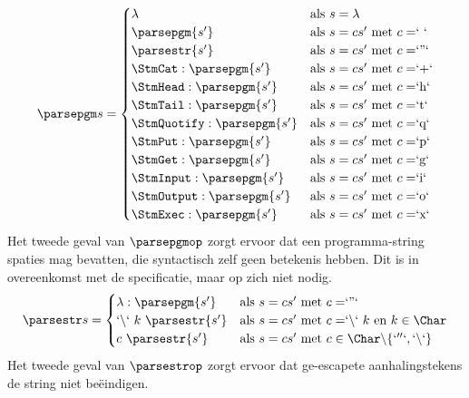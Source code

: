 $$
	\parsepgm s =
		\begin{cases}
			\lambda & \text{als $s=\lambda$}\\
            \parsepgm{s'} & \text{als $s=cs'$ met $c=$` `}\\
            \parsestr{s'} & \text{als $s=cs'$ met $c=$`''`}\\
            \StmCat:\parsepgm{s'} & \text{als $s=cs'$ met $c=$`+`}\\
            \StmHead:\parsepgm{s'} & \text{als $s=cs'$ met $c=$`h`}\\
            \StmTail:\parsepgm{s'} & \text{als $s=cs'$ met $c=$`t`}\\
            \StmQuotify:\parsepgm{s'} & \text{als $s=cs'$ met $c=$`q`}\\
            \StmPut:\parsepgm{s'} & \text{als $s=cs'$ met $c=$`p`}\\
            \StmGet:\parsepgm{s'} & \text{als $s=cs'$ met $c=$`g`}\\
            \StmInput:\parsepgm{s'} & \text{als $s=cs'$ met $c=$`i`}\\
            \StmOutput:\parsepgm{s'} & \text{als $s=cs'$ met $c=$`o`}\\
			\StmExec:\parsepgm{s'} & \text{als $s=cs'$ met $c=$`x`}\\
		\end{cases}
$$
Het tweede geval van $\parsepgmop$ zorgt ervoor dat een programma-string spaties mag bevatten, die syntactisch zelf geen betekenis hebben. Dit is in overeenkomst met de specificatie, maar op zich niet nodig.
$$
	\parsestr s =
		\begin{cases}
			\lambda:\parsepgm{s'} & \text{als $s=cs'$ met $c=$`''`}\\
            `\backslash`~k~\parsestr{s'} & \text{als $s=cs'$ met $c=$`$\backslash$`~$k$ en $k\in\Char$}\\
            c~\parsestr{s'} & \text{als $s=cs'$ met $c \in\Char\backslash\{`''`, `\backslash`\}$}\\
		\end{cases}
$$
Het tweede geval van $\parsestrop$ zorgt ervoor dat ge-escapete aanhalingstekens de string niet beëindigen.

